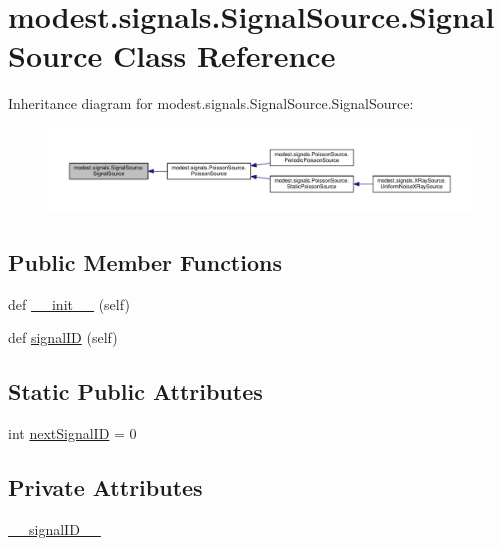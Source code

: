 \hypertarget{classmodest_1_1signals_1_1SignalSource_1_1SignalSource}{}\section{modest.\+signals.\+Signal\+Source.\+Signal\+Source Class Reference}
\label{classmodest_1_1signals_1_1SignalSource_1_1SignalSource}


Inheritance diagram for modest.\+signals.\+Signal\+Source.\+Signal\+Source\+:
\nopagebreak
\begin{figure}[H]
\begin{center}
\leavevmode
\includegraphics[width=350pt]{classmodest_1_1signals_1_1SignalSource_1_1SignalSource__inherit__graph}
\end{center}
\end{figure}
\subsection*{Public Member Functions}
\begin{DoxyCompactItemize}
\item 
def \hyperlink{classmodest_1_1signals_1_1SignalSource_1_1SignalSource_a7e2f5b1d4d957d78db114574dcb05de3}{\+\_\+\+\_\+init\+\_\+\+\_\+} (self)
\item 
def \hyperlink{classmodest_1_1signals_1_1SignalSource_1_1SignalSource_af652db2ed97925595d650fd909d6a2d4}{signal\+ID} (self)
\end{DoxyCompactItemize}
\subsection*{Static Public Attributes}
\begin{DoxyCompactItemize}
\item 
int \hyperlink{classmodest_1_1signals_1_1SignalSource_1_1SignalSource_a7a87b05025246170067fbf9ed3ef49fd}{next\+Signal\+ID} = 0
\end{DoxyCompactItemize}
\subsection*{Private Attributes}
\begin{DoxyCompactItemize}
\item 
\hyperlink{classmodest_1_1signals_1_1SignalSource_1_1SignalSource_ae94cf1f121ca8b17509b55c0590457e4}{\+\_\+\+\_\+signal\+I\+D\+\_\+\+\_\+}
\end{DoxyCompactItemize}


